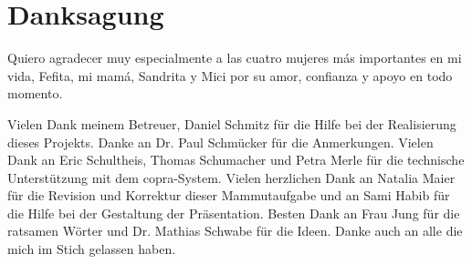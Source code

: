 \chapter*{Danksagung}

Quiero agradecer muy especialmente a las cuatro mujeres m\'as importantes en mi vida, Fefita, mi mam\'a, Sandrita y Mici por su amor, confianza y apoyo en todo momento.

Vielen Dank meinem Betreuer, Daniel Schmitz für die Hilfe bei der Realisierung dieses Projekts. Danke an Dr. Paul Schmücker für die Anmerkungen. Vielen Dank an Eric Schultheis, Thomas Schumacher und Petra Merle für die technische Unterstützung mit dem \acs{copra}-System. Vielen herzlichen Dank an Natalia Maier für die Revision und Korrektur dieser Mammutaufgabe und an Sami Habib für die Hilfe bei der Gestaltung der Präsentation. Besten Dank an Frau Jung für die ratsamen Wörter und Dr. Mathias Schwabe für die Ideen. Danke auch an alle die mich im Stich gelassen haben.
